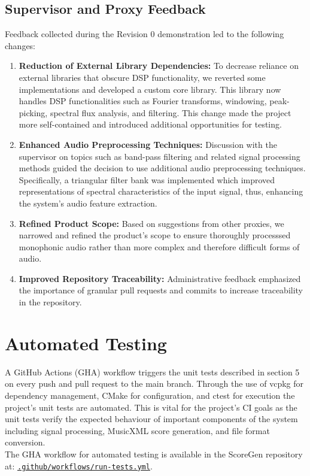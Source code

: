 \documentclass[12pt, titlepage]{article}
\begin{document}
\subsection{Supervisor and Proxy Feedback}
Feedback collected during the Revision 0 demonstration led to the following changes:
\begin{enumerate}
    \item \textbf{Reduction of External Library Dependencies:} To decrease reliance on external libraries that obscure DSP functionality, 
    we reverted some implementations and developed a custom core library. This library now handles DSP functionalities such as Fourier transforms, windowing, 
    peak-picking, spectral flux analysis, and filtering. This change made the project more self-contained and introduced additional opportunities for testing.
    \item \textbf{Enhanced Audio Preprocessing Techniques:} Discussion with the supervisor on topics such as band-pass filtering and related signal processing methods 
    guided the decision to use additional audio preprocessing techniques. Specifically, a triangular filter bank was implemented which improved representations of 
    spectral characteristics of the input signal, thus, enhancing the system's audio feature extraction.
    \item \textbf{Refined Product Scope:} Based on suggestions from other proxies, we narrowed and refined the product's scope to ensure thoroughly processsed
    monophonic audio rather than more complex and therefore difficult forms of audio.
    \item \textbf{Improved Repository Traceability:} Administrative feedback emphasized the importance of granular pull requests and commits to increase 
    traceability in the repository.
\end{enumerate}

\section{Automated Testing}
A GitHub Actions (GHA) workflow triggers the unit tests described in section 5 on every push and pull request to the main branch. 
Through the use of vcpkg for dependency management, CMake for configuration, and ctest for execution the project's unit tests are 
automated. This is vital for the project's CI goals as the unit tests verify the expected behaviour of important components of the 
system including signal processing, MusicXML score generation, and file format conversion. \\
The GHA workflow for automated testing is available in the ScoreGen repository at: 
\href{https://github.com/emilyperica/ScoreGen/blob/main/.github/workflows/run-tests.yml}{\texttt{.github/workflows/run-tests.yml}}.
\end{document}
